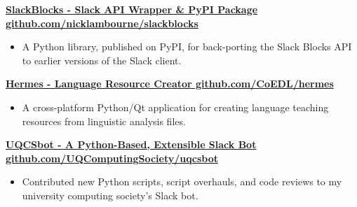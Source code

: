 \documentclass[a4paper]{article}
\newenvironment{singleitem}
{   \small
    \vspace{0pt}
    \begin{itemize}
    \setlength{\itemsep}{0pt}
    \setlength{\parskip}{0pt}
    \setlength{\parsep}{0pt}   }
{\end{itemize} \vspace{1pt}	}
\begin{document}
\textbf{\href{https://github.com/nicklambourne/slackblocks}{SlackBlocks - Slack API Wrapper \& PyPI Package \hfill github.com/nicklambourne/slackblocks}}
\begin{singleitem}
	\item A Python library, published on PyPI, for back-porting the Slack Blocks API to earlier versions of the Slack client.
\end{singleitem}

\textbf{\href{https://github.com/CoEDL/hermes}{Hermes - Language Resource Creator \hfill github.com/CoEDL/hermes}}
\begin{singleitem}
	\item A cross-platform Python/Qt application for creating language teaching resources from linguistic analysis files.
\end{singleitem}


\textbf{\href{https://github.com/UQComputingSociety/uqcsbot}{UQCSbot - A Python-Based, Extensible Slack Bot \hfill github.com/UQComputingSociety/uqcsbot}}
\begin{singleitem}
	\item Contributed new Python scripts, script overhauls, and code reviews to my university computing society's Slack bot.
\end{singleitem}




\vspace{1mm}
\end{document}
